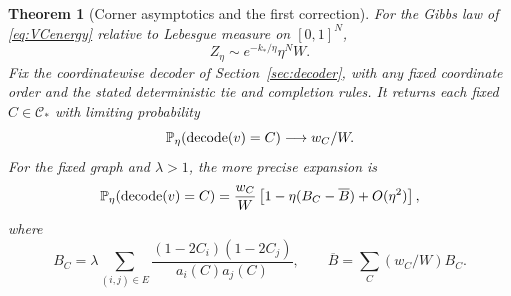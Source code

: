 \documentclass[11pt]{article}
\newtheorem{theorem}{Theorem}[section]
\theoremstyle{definition}\newtheorem{definition}[theorem]{Definition}
\theoremstyle{remark}\newtheorem{remark}[theorem]{Remark}
\numberwithin{equation}{section}
\newcommand{\1}{\mathbf 1}
\begin{document}
\begin{theorem}[Corner asymptotics and the first correction]\label{thm:corner}
For the Gibbs law of \eqref{eq:VCenergy} relative to Lebesgue measure on $[0,1]^N$,
\begin{equation}
Z_\eta\sim e^{-k_*/\eta}\eta^N W.\label{eq:graphZ}
\end{equation}
Fix the coordinatewise decoder of Section~\ref{sec:decoder}, with any fixed coordinate order and the stated deterministic tie and completion rules. It returns each fixed $C\in\mathcal C_*$ with limiting probability
\begin{equation}
\mathbb P_\eta(\operatorname{decode}(v)=C)\longrightarrow w_C/W.\label{eq:cornerweights}
\end{equation}
For the fixed graph and $\lambda>1$, the more precise expansion is
\begin{equation}
\mathbb P_\eta(\operatorname{decode}(v)=C)
=\frac{w_C}{W}\left[1-\eta(B_C-\overline B)+O(\eta^2)\right],\label{eq:firstordergraph}
\end{equation}
where
\[
B_C=\lambda\sum_{(i,j)\in E}\frac{(1-2C_i)(1-2C_j)}{a_i(C)a_j(C)},
\qquad \overline B=\sum_C(w_C/W)B_C.
\]
\end{theorem}
\end{document}
